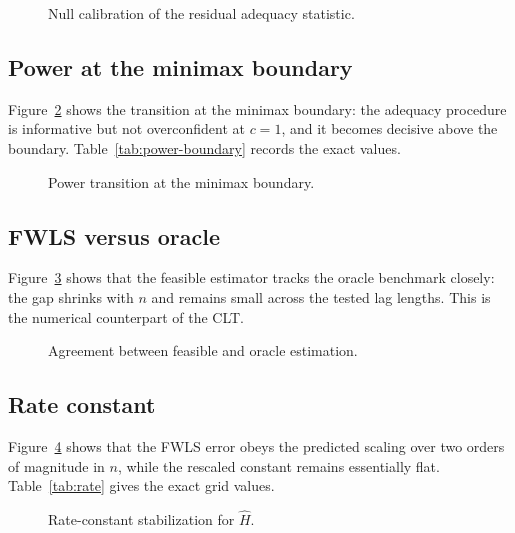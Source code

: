 \documentclass[10pt,a4paper,twocolumn]{article}
\begin{document}
\begin{figure}[t]
\centering
{}
\caption{Null calibration of the residual adequacy statistic.}
\label{fig:null-calibration}
\end{figure}

\subsection{Power at the minimax boundary}

Figure~\ref{fig:power-boundary} shows the transition at the minimax boundary:
the adequacy procedure is informative but not overconfident at $c=1$, and it
becomes decisive above the boundary.  Table~\ref{tab:power-boundary} records
the exact values.

\begin{figure}[t]
\centering
{}
\caption{Power transition at the minimax boundary.}
\label{fig:power-boundary}
\end{figure}

\subsection{FWLS versus oracle}

Figure~\ref{fig:fwls-oracle-gap} shows that the feasible estimator tracks the
oracle benchmark closely: the gap shrinks with $n$ and remains small across
the tested lag lengths.  This is the numerical counterpart of the CLT.

\begin{figure}[t]
\centering
{}
\caption{Agreement between feasible and oracle estimation.}
\label{fig:fwls-oracle-gap}
\end{figure}

\subsection{Rate constant}

Figure~\ref{fig:rate-constant} shows that the FWLS error obeys the predicted
scaling over two orders of magnitude in $n$, while the rescaled constant
remains essentially flat.  Table~\ref{tab:rate} gives the exact grid values.

\begin{figure}[t]
\centering
{}
\caption{Rate-constant stabilization for $\widehat H$.}
\label{fig:rate-constant}
\end{figure}
\end{document}
